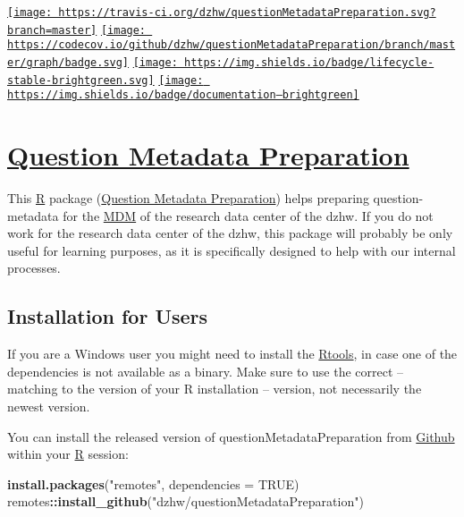 \documentclass[
]{article}
\author{}
\date{\vspace{-2.5em}}
\newenvironment{Shaded}{\begin{snugshade}}{\end{snugshade}}
\newcommand{\DataTypeTok}[1]{\textcolor[rgb]{0.13,0.29,0.53}{#1}}
\newcommand{\KeywordTok}[1]{\textcolor[rgb]{0.13,0.29,0.53}{\textbf{#1}}}
\newcommand{\NormalTok}[1]{#1}
\newcommand{\OperatorTok}[1]{\textcolor[rgb]{0.81,0.36,0.00}{\textbf{#1}}}
\newcommand{\OtherTok}[1]{\textcolor[rgb]{0.56,0.35,0.01}{#1}}
\newcommand{\StringTok}[1]{\textcolor[rgb]{0.31,0.60,0.02}{#1}}
\begin{document}
\href{https://travis-ci.org/dzhw/questionMetadataPreparation}{\texttt{[image: https://travis-ci.org/dzhw/questionMetadataPreparation.svg?branch=master]}}
\href{https://codecov.io/github/dzhw/questionMetadataPreparation?branch=master}{\texttt{[image: https://codecov.io/github/dzhw/questionMetadataPreparation/branch/master/graph/badge.svg]}}
\href{https://www.tidyverse.org/lifecycle/\#stable}{\texttt{[image: https://img.shields.io/badge/lifecycle-stable-brightgreen.svg]}}
\href{https://dzhw.github.io/questionMetadataPreparation/}{\texttt{[image: https://img.shields.io/badge/documentation--brightgreen]}}

\hypertarget{question-metadata-preparation}{%
\section{\texorpdfstring{\href{https://dzhw.github.io/questionMetadataPreparation/}{Question
Metadata
Preparation}}{Question Metadata Preparation}}\label{question-metadata-preparation}}

This \href{https://www.r-project.org/about.html}{R} package
(\href{https://dzhw.github.io/questionMetadataPreparation/}{Question
Metadata Preparation}) helps preparing question-metadata for the
\href{https://metadata.fdz.dzhw.eu}{MDM} of the research data center of
the dzhw. If you do not work for the research data center of the dzhw,
this package will probably be only useful for learning purposes, as it
is specifically designed to help with our internal processes.

\hypertarget{installation-for-users}{%
\subsection{Installation for Users}\label{installation-for-users}}

If you are a Windows user you might need to install the
\href{https://cran.r-project.org/bin/windows/Rtools/}{Rtools}, in case
one of the dependencies is not available as a binary. Make sure to use
the correct -- matching to the version of your R installation --
version, not necessarily the newest version.

You can install the released version of questionMetadataPreparation from
\href{https://github.com/dzhw/questionMetadataPreparation}{Github}
within your \href{https://www.r-project.org/about.html}{R} session:

\begin{Shaded}
\begin{Highlighting}[]
\KeywordTok{install.packages}\NormalTok{(}\StringTok{"remotes"}\NormalTok{, }\DataTypeTok{dependencies =} \OtherTok{TRUE}\NormalTok{)}
\NormalTok{remotes}\OperatorTok{::}\KeywordTok{install\_github}\NormalTok{(}\StringTok{"dzhw/questionMetadataPreparation"}\NormalTok{)}
\end{Highlighting}
\end{Shaded}
\end{document}
